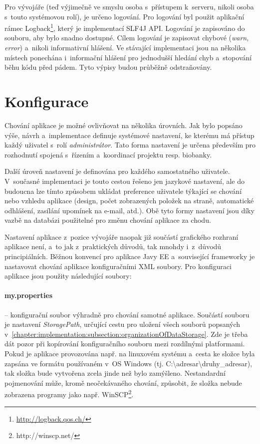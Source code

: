 \documentclass[11pt, final, oneside]{fithesis2}
\begin{document}
Pro vývojáře (teď výjimečně ve smyslu osoba s~přístupem k~serveru, nikoli osoba s~touto systémovou rolí), je určeno logování. Pro logování byl použit aplikační rámec Logback\footnote{\url{http://logback.qos.ch/}}, který je implementací SLF4J API. Logování je zapisováno do souboru, aby bylo snadno dostupné. Cílem logování je zapisovat chybové (\textit{warn}, \textit{error}) a~nikoli informativní hlášení. Ve stávající implementaci jsou na několika místech ponechána i~informační hlášení pro jednodušší hledání chyb a~stopování běhu kódu před pádem. Tyto výpisy budou průběžně odstraňovány.


\section{Konfigurace}\label{chapter:implementation:section:configuration}
Chování aplikace je možné ovlivňovat na několika úrovních. Jak bylo popsáno výše, návrh a~implementace definuje systémové nastavení, ke kterému má přístup každý uživatel s~rolí \textit{administrátor}. Tato forma nastavení je určena především pro rozhodnutí spojená s~řízením a~koordinací projektu resp. biobanky. 

Další úroveň nastavení je definována pro každého samostatného uživatele. V~současné implementaci je touto cestou řešeno jen jazykové nastavení, ale do budoucna lze tímto způsobem ukládat preference uživatele týkající se chování nebo vzhledu aplikace (design, počet zobrazených položek na straně, automatické odhlášení, zasílání upomínek na e-mail, atd.).
Obě tyto formy nastavení jsou díky vazbě na databázi použitelné pro změnu chování aplikace za chodu. 

Nastavení aplikace z~pozice vývojáře naopak již součástí grafického rozhraní aplikace není, a~to jak z~praktických důvodů, tak mnohdy i~z~důvodů principiálních. Běžnou konvencí pro aplikace Javy EE a~související frameworky je nastavovat chování aplikace konfiguračními XML soubory. Pro konfiguraci aplikace jsou použity následující soubory:

\paragraph*{my.properties} -- konfigurační soubor výhradně pro chování samotné aplikace. Součástí souboru je nastavení \textit{StoragePath}, určující cestu pro uložení všech souborů popsaných v~\ref{chapter:implementation:subsection:organizationOfDataStorage}. Zde je třeba dát pozor při kopírování konfiguračního souboru mezi rozdílnými platformami. Pokud je aplikace provozována např. na linuxovém systému a~cesta ke složce byla zapsána ve formátu používaném v~OS Windows (tj. C:\textbackslash adresar\textbackslash druhy\_adresar), tak složka bude vytvořena zcela jinde než bylo zamýšleno. Nestandardní pojmenování může, kromě neočekávaného chování, způsobit, že složka nebude zobrazena programy jako např. WinSCP\footnote{http://winscp.net/}. 
\end{document}
